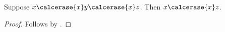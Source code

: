 

\begin{composition}\label{calculation_erased_endpoint_capture}
    Suppose $x\calcerase{x}y\calcerase{x}z$.
    Then $x\calcerase{x}z$.
\end{composition}
\begin{proof} Follows by . \end{proof}
